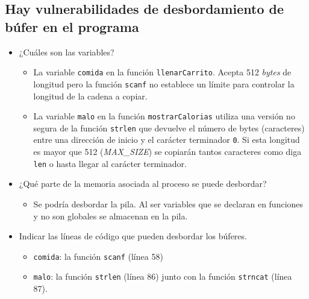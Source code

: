 \documentclass[10pt,a4paper]{article}
\begin{document}
\subsection{Hay vulnerabilidades de desbordamiento de búfer en el programa}
\begin{itemize}
\item ¿Cuáles son las variables?
	\begin{itemize}
	\item La variable \texttt{comida} en la función \texttt{llenarCarrito}. Acepta 512 \emph{bytes} de longitud pero la función \texttt{scanf} no establece un límite para controlar la longitud de la cadena a copiar.
	\item La variable \texttt{malo} en la función \texttt{mostrarCalorias} utiliza una versión no segura de la función \texttt{strlen} que devuelve el número de bytes (caracteres) entre una dirección de inicio y el carácter terminador \texttt{0}. Si esta longitud es mayor que 512 (\emph{MAX\_{}SIZE}) se copiarán tantos caracteres como diga \texttt{len} o hasta llegar al carácter terminador.
	\end{itemize}
\item ¿Qué parte de la memoria asociada al proceso se puede desbordar?
	\begin{itemize}
	\item Se podría desbordar la pila. Al ser variables que se declaran en funciones y no son globales se almacenan en la pila.
	\end{itemize}
\item Indicar las líneas de código que pueden desbordar los búferes.
	\begin{itemize}
	\item \texttt{comida}: la función \texttt{scanf} (línea 58)
	\item \texttt{malo}: la función \texttt{strlen} (línea 86) junto con la función \texttt{strncat}  (línea 87).
	\end{itemize}
\end{itemize}
\end{document}
